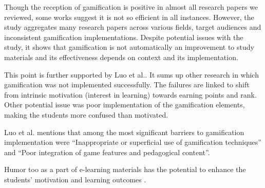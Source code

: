 Though the reception of gamification is positive in almost all research papers we reviewed, some works suggest it is not so efficient in all instances\cite{haters}. However, the study aggregates many research papers across various fields, target audiences and inconsistent gamification implementations. Despite potential issues with the study, it shows that gamification is not automatically an improvement to study materials and its effectiveness depends on context and its implementation. 

This point is further supported by Luo et al.\cite{luo2022gamification}. It sums up other research in which gamification was not implemented successfully. The failures are linked to shift from intrinsic motivation (interest in learning) towards earning points and rank. Other potential issue was poor implementation of the gamification elements, making the students more confused than motivated.

Luo et al.\cite{luo2022gamification} mentions that among the most significant barriers to gamification implementation were \enquote{Inappropriate or superficial use of gamification techniques} and \enquote{Poor integration of game features and pedagogical content}.

Humor too as a part of e-learning materials has the potential to enhance the students' motivation and learning outcomes \cite{chin2010learning}. 




